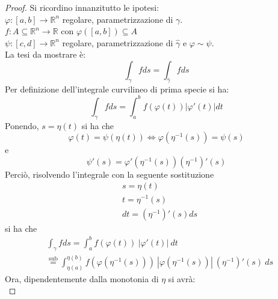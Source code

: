     \begin{proof}
        Si ricordino innanzitutto le ipotesi:\\
        \indent $\varphi:[a,b]\to \mathbb{R}^n$ regolare, parametrizzazione di $\gamma$.\\
        \indent $f:A\subseteq\mathbb{R}^n \to \mathbb{R}$ con $\varphi([a,b]) \subseteq A$\\
        \indent $\psi:[c, d]\to \mathbb{R}^n$ regolare, parametrizzazione di $\hat{\gamma}$ e $\varphi \sim \psi$.\\
        La tesi da mostrare è:
        \begin{equation*}
            \int_\gamma{f ds}=\int_{\hat{\gamma}}{f ds}
        \end{equation*}
        Per definizione dell'integrale curvilineo di prima specie si ha:
        \begin{equation*}
            \int_\gamma{fds}= \int_{a}^{b}{f(\varphi(t))|\varphi'(t)|dt}
        \end{equation*}
        Ponendo, $s=\eta(t)$ si ha che
        \begin{equation*}
            \varphi(t)=\psi(\eta(t)) \iff \varphi(\eta^{-1}(s))=\psi(s)    
        \end{equation*}
        e
        \begin{equation*}
            \psi'(s)=\varphi'(\eta^{-1}(s))(\eta^{-1})'(s)
        \end{equation*}
        Perciò, risolvendo l'integrale con la seguente sostituzione 
        \begin{equation*}
            \begin{aligned}
            &s=\eta(t) \\ &t=\eta^{-1}(s) \\ &dt=(\eta^{-1})'(s)ds
            \end{aligned}
        \end{equation*}
        si ha che
        \begin{equation*}
            \begin{aligned}
                &\int_\gamma{fds} = \int_{a}^{b}{f(\varphi(t))\ |\varphi'(t)|\ dt}\\
                &\overset{\text{sub}}{=} \int_{\eta(a)}^{\eta(b)}{f(\varphi(\eta^{-1}(s)))\ |\varphi(\eta^{-1}(s))|\ (\eta^{-1})'(s)\ ds}
            \end{aligned}
        \end{equation*}
        Ora, dipendentemente dalla monotonia di $\eta$ si avrà:\\

\end{proof}
